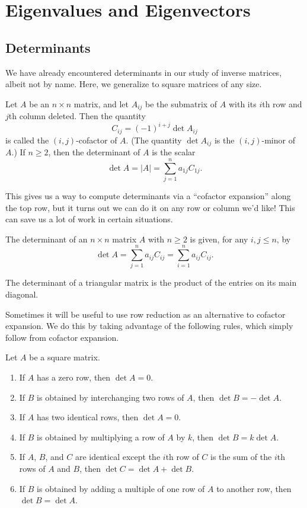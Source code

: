\documentclass[../m073main.tex]{subfiles}
\begin{document}
\chapter{Eigenvalues and Eigenvectors}
\section{Determinants}
We have already encountered determinants in our study of inverse matrices, albeit not by name.
Here, we generalize to square matrices of any size.

\begin{definition}[Determinant]
	Let $A$ be an $n \times n$ matrix, and let $A_{ij}$ be the submatrix of $A$ with its $i$th row and $j$th column deleted.
	Then the quantity
	\[ C_{ij} = (-1)^{i+j} \det A_{ij} \]
	is called the $(i,j)$-cofactor of $A$.
	(The quantity $\det A_{ij}$ is the $(i,j)$-minor of $A$.)
	If $n \geq 2$, then the determinant of $A$ is the scalar
	\[ \det A = |A| = \sum_{j = 1}^{n} a_{1j} C_{1j}. \]
\end{definition}

This gives us a way to compute determinants via a ``cofactor expansion'' along the top row, but it turns out we can do it on any row or column we'd like!
This can save us a lot of work in certain situations.

\begin{theorem}
	The determinant of an $n \times n$ matrix $A$ with $n \geq 2$ is given, for any $i,j \leq n$, by
	\[ \det A = \sum_{j = 1}^{n} a_{ij} C_{ij} = \sum_{i = 1}^{n} a_{ij} C_{ij}. \]
\end{theorem}

\begin{theorem}
	The determinant of a triangular matrix is the product of the entries on its main diagonal.
\end{theorem}

Sometimes it will be useful to use row reduction as an alternative to cofactor expansion.
We do this by taking advantage of the following rules, which simply follow from cofactor expansion.

\begin{theorem}
	Let $A$ be a square matrix.
	\begin{enumerate}[label=(\alph*)]
		\item If $A$ has a zero row, then $\det A = 0$.
		\item If $B$ is obtained by interchanging two rows of $A$, then $\det B = -\det A$.
		\item If $A$ has two identical rows, then $\det A = 0$.
		\item If $B$ is obtained by multiplying a row of $A$ by $k$, then $\det B = k \det A$.
		\item If $A$, $B$, and $C$ are identical except the $i$th row of $C$ is the sum of the $i$th rows of $A$ and $B$, then $\det C = \det A + \det B$.
		\item If $B$ is obtained by adding a multiple of one row of $A$ to another row, then $\det B = \det A$.
	\end{enumerate}
\end{theorem}
\end{document}
